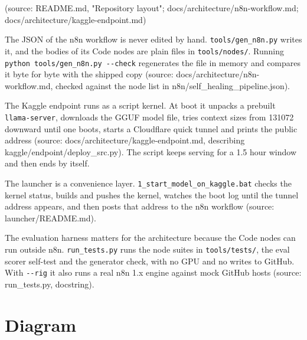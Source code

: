 \documentclass[11pt,a4paper]{report}
\begin{document}
(source: README.md, "Repository layout"; docs/architecture/n8n-workflow.md; docs/architecture/kaggle-endpoint.md)

The JSON of the n8n workflow is never edited by hand. \texttt{tools/\allowbreak{}gen\_\allowbreak{}n8n.\allowbreak{}py} writes it, and the bodies of its Code nodes are plain files in \texttt{tools/\allowbreak{}nodes/\allowbreak{}}. Running \texttt{python tools/\allowbreak{}gen\_\allowbreak{}n8n.\allowbreak{}py -\allowbreak{}-\allowbreak{}check} regenerates the file in memory and compares it byte for byte with the shipped copy (source: docs/architecture/n8n-workflow.md, checked against the node list in n8n/self\_healing\_pipeline.json).

The Kaggle endpoint runs as a script kernel. At boot it unpacks a prebuilt \texttt{llama-\allowbreak{}server}, downloads the GGUF model file, tries context sizes from 131072 downward until one boots, starts a Cloudflare quick tunnel and prints the public address (source: docs/architecture/kaggle-endpoint.md, describing kaggle/endpoint/deploy\_src.py). The script keeps serving for a 1.5 hour window and then ends by itself.

The launcher is a convenience layer. \texttt{1\_\allowbreak{}start\_\allowbreak{}model\_\allowbreak{}on\_\allowbreak{}kaggle.\allowbreak{}bat} checks the kernel status, builds and pushes the kernel, watches the boot log until the tunnel address appears, and then posts that address to the n8n workflow (source: launcher/README.md).

The evaluation harness matters for the architecture because the Code nodes can run outside n8n. \texttt{run\_\allowbreak{}tests.\allowbreak{}py} runs the node suites in \texttt{tools/\allowbreak{}tests/\allowbreak{}}, the eval scorer self-test and the generator check, with no GPU and no writes to GitHub. With \texttt{-\allowbreak{}-\allowbreak{}rig} it also runs a real n8n 1.x engine against mock GitHub hosts (source: run\_tests.py, docstring).

\section{Diagram}
\end{document}
